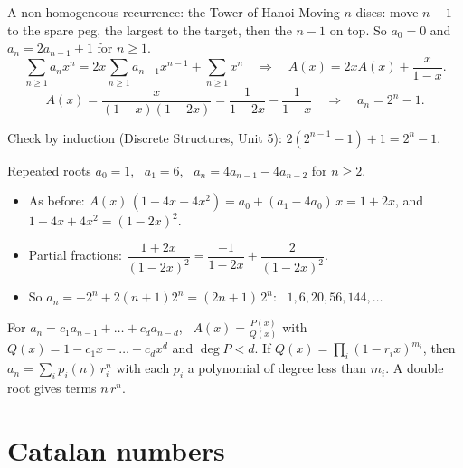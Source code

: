 \documentclass[10pt]{wosm-slides}
\begin{document}
\begin{frame}{A non-homogeneous recurrence: the Tower of Hanoi}
  Moving $n$ discs: move $n - 1$ to the spare peg, the largest to the target, then the $n - 1$
  on top. So $a_0 = 0$ and $a_n = 2a_{n-1} + 1$ for $n \ge 1$.
  \pause
  \[ \sum_{n \ge 1} a_n x^n = 2x \sum_{n \ge 1} a_{n-1} x^{n-1} + \sum_{n \ge 1} x^n
     \quad\Longrightarrow\quad A(x) = 2x A(x) + \frac{x}{1-x} . \]
  \pause
  \[ A(x) = \frac{x}{(1 - x)(1 - 2x)} = \frac{1}{1 - 2x} - \frac{1}{1 - x}
     \quad\Longrightarrow\quad a_n = 2^n - 1 . \]
  {\small Check by induction (Discrete Structures, Unit 5):
  $2(2^{n-1} - 1) + 1 = 2^n - 1$.\par}
\end{frame}

\begin{frame}{Repeated roots}
  $a_0 = 1$, \ $a_1 = 6$, \ $a_n = 4a_{n-1} - 4a_{n-2}$ for $n \ge 2$.
  \pause
  \begin{itemize}
    \item As before: $A(x)\,(1 - 4x + 4x^2) = a_0 + (a_1 - 4a_0)\,x = 1 + 2x$, and
      $1 - 4x + 4x^2 = (1 - 2x)^2$.
    \item Partial fractions:
      $\dfrac{1 + 2x}{(1 - 2x)^2} = \dfrac{-1}{1 - 2x} + \dfrac{2}{(1 - 2x)^2}$.
    \item So $a_n = -2^n + 2(n + 1) 2^n = (2n + 1)\, 2^n$: \ $1, 6, 20, 56, 144, \dots$
  \end{itemize}
  \pause
  \begin{remark}[In general]
    For $a_n = c_1 a_{n-1} + \dots + c_d a_{n-d}$, \ $A(x) = \frac{P(x)}{Q(x)}$ with
    $Q(x) = 1 - c_1 x - \dots - c_d x^d$ and $\deg P < d$. If
    $Q(x) = \prod_i (1 - r_i x)^{m_i}$, then $a_n = \sum_i p_i(n)\, r_i^n$ with each $p_i$ a
    polynomial of degree less than $m_i$. A double root gives terms $n\, r^n$.
  \end{remark}
\end{frame}

\section{Catalan numbers}
\end{document}
